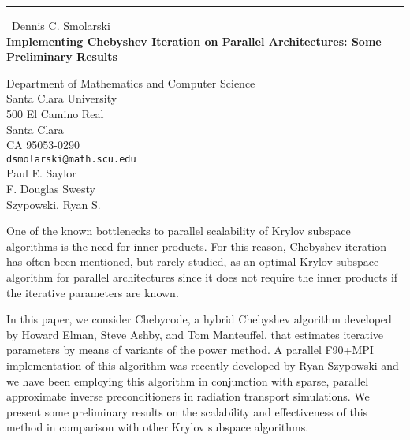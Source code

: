 \documentclass{report}
\begin{document}
\begin{center}
\rule{6in}{1pt} \
{\large Dennis C. Smolarski \\
{\bf Implementing Chebyshev Iteration on Parallel Architectures: Some Preliminary Results}}

Department of Mathematics and Computer Science \\ Santa Clara University \\ 500 El Camino Real \\ Santa Clara \\ CA  95053-0290
\\
{\tt dsmolarski@math.scu.edu}\\
Paul E. Saylor\\
F. Douglas Swesty\\
	Szypowski, Ryan S.\end{center}

One of the known bottlenecks to parallel scalability of Krylov
subspace algorithms is the need for inner products. For this
reason, Chebyshev iteration has often been mentioned, but
rarely studied, as an optimal Krylov subspace algorithm for
parallel architectures since it does not require the inner
products if the iterative parameters are known.

In this paper, we consider {\sc Chebycode,} a hybrid Chebyshev
algorithm developed by Howard Elman, Steve Ashby, and Tom
Manteuffel, that estimates iterative parameters by means of
variants of the power method. A parallel F90+MPI implementation of
this algorithm was recently developed by Ryan Szypowski and we
have been employing this algorithm in conjunction with sparse,
parallel approximate inverse preconditioners in radiation
transport simulations. We present some preliminary results on the
scalability and effectiveness of this method in comparison with
other Krylov subspace algorithms.
\end{document}
